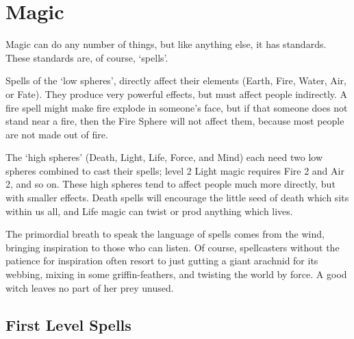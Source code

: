 \chapter[Chamber of Magic]{Magic}
\toggletrue{examplecharacter}

\begin{multicols}{2}

\noindent
Magic can do any number of things, but like anything else, it has standards.
These standards are, of course, `spells'.

Spells of the `low spheres', directly affect their elements (Earth, Fire, Water, Air, or Fate).
They produce very powerful effects, but must affect people indirectly.
A fire spell might make fire explode in someone's face, but if that someone does not stand near a fire, then the Fire Sphere will not affect them, because most people are not made out of fire.

The `high spheres' (Death, Light, Life, Force, and Mind) each need two low spheres combined to cast their spells; level 2 Light magic requires Fire 2 and Air 2, and so on.
These high spheres tend to affect people much more directly, but with smaller effects.
Death spells will encourage the little seed of death which sits within us all, and Life magic can twist or prod anything which lives.

The primordial breath to speak the language of spells comes from the wind, bringing inspiration to those who can listen.
Of course, spellcasters without the patience for inspiration often resort to just gutting a giant arachnid for its webbing, mixing in some griffin-feathers, and twisting the world by force.
A good witch leaves no part of her prey unused. 

\columnbreak


\end{multicols}

\section{First Level Spells}

